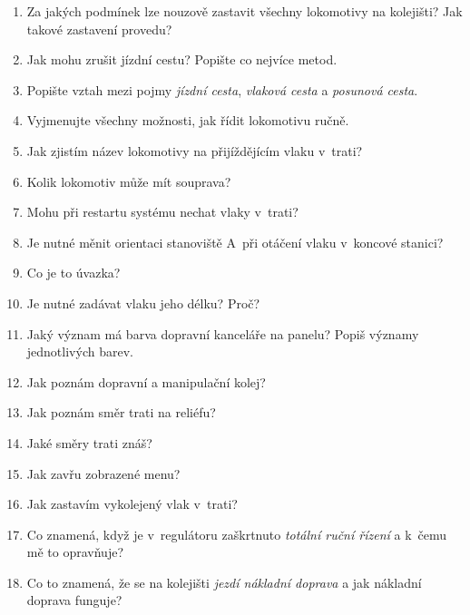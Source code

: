 \documentclass[12pt,a4paper]{article}
\begin{document}
\begin{enumerate}[leftmargin=*]
\item Za jakých podmínek lze nouzově zastavit všechny lokomotivy na kolejišti?
Jak takové zastavení provedu?

\item Jak mohu zrušit jízdní cestu? Popište co nejvíce metod.

\item Popište vztah mezi pojmy \textit{jízdní cesta}, \textit{vlaková cesta} a
\textit{posunová cesta}.

\item Vyjmenujte všechny možnosti, jak řídit lokomotivu ručně.

\item Jak zjistím název lokomotivy na přijíždějícím vlaku v~trati?

\item Kolik lokomotiv může mít souprava?

\item Mohu při restartu systému nechat vlaky v~trati?

\item Je nutné měnit orientaci stanoviště A~při otáčení vlaku v~koncové
stanici?

\item Co je to úvazka?

\item Je nutné zadávat vlaku jeho délku? Proč?

\item Jaký význam má barva dopravní kanceláře na panelu? Popiš významy
jednotlivých barev.

\item Jak poznám dopravní a manipulační kolej?

\item Jak poznám směr trati na reliéfu?

\item Jaké směry trati znáš?

\item Jak zavřu zobrazené menu?

\item Jak zastavím vykolejený vlak v~trati?

\item Co znamená, když je v~regulátoru zaškrtnuto \textit{totální ruční řízení}
a k~čemu mě to opravňuje?

\item Co to znamená, že se na kolejišti \textit{jezdí nákladní doprava} a jak
nákladní doprava funguje?


\end{enumerate}
\end{document}
